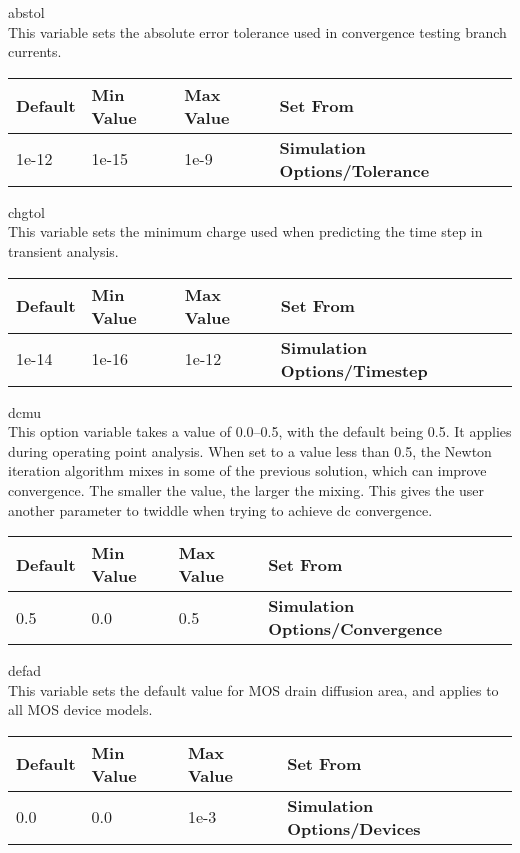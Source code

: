\begin{description}
\item{\et abstol}\\
This variable sets the absolute error tolerance used in convergence
testing branch currents.

\begin{tabular}{|l|l|l|l|}\hline
\bf Default & \bf Min Value & \bf Max Value & \bf Set From\\ \hline
1e-12 & 1e-15 & 1e-9 & \bf Simulation Options/Tolerance\\ \hline
\end{tabular}
 
\item{\et chgtol}\\
This variable sets the minimum charge used when predicting the time
step in transient analysis.

\begin{tabular}{|l|l|l|l|}\hline
\bf Default & \bf Min Value & \bf Max Value & \bf Set From\\ \hline
1e-14 & 1e-16 & 1e-12 & \bf Simulation Options/Timestep\\ \hline
\end{tabular}

\item{\et dcmu}\\
This option variable takes a value of 0.0--0.5, with the default being
0.5.  It applies during operating point analysis.  When set to a value
less than 0.5, the Newton iteration algorithm mixes in some of the
previous solution, which can improve convergence.  The smaller the
value, the larger the mixing.  This gives the user another parameter
to twiddle when trying to achieve dc convergence.

\begin{tabular}{|l|l|l|l|}\hline
\bf Default & \bf Min Value & \bf Max Value & \bf Set From\\ \hline
0.5 & 0.0 & 0.5 & \bf Simulation Options/Convergence\\ \hline
\end{tabular}

\item{\et defad}\\
This variable sets the default value for MOS drain diffusion area, and
applies to all MOS device models.

\begin{tabular}{|l|l|l|l|}\hline
\bf Default & \bf Min Value & \bf Max Value & \bf Set From\\ \hline
0.0 & 0.0 & 1e-3 & \bf Simulation Options/Devices\\ \hline
\end{tabular}
 

\end{description}

